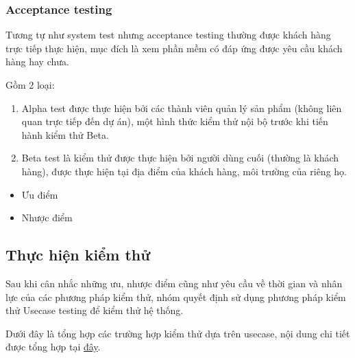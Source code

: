 \subsubsection{Acceptance testing}
Tương tự như system test nhưng acceptance testing thường được khách hàng trực tiếp thực hiện, mục đích là xem phần mềm có đáp ứng được yêu cầu khách hàng hay chưa.

Gồm 2 loại:
\begin{enumerate}
    \item Alpha test được thực hiện bởi các thành viên quản lý sản phẩm (không liên quan trực tiếp đến dự án), một hình thức kiểm thử nội bộ trước khi tiến hành kiểm thử Beta.
    \item Beta test là kiểm thử được thực hiện bởi người dùng cuối (thường là khách hàng), được thực hiện tại địa điểm của khách hàng, môi trường của riêng họ.
\end{enumerate}

\begin{itemize}
    \item Ưu điểm
    \item Nhược điểm
\end{itemize}

\subsection{Thực hiện kiểm thử}

Sau khi cân nhắc những ưu, nhược điểm cũng như yêu cầu về thời gian và nhân lực của các phương pháp kiểm thử, nhóm quyết định sử dụng phương pháp kiểm thử Usecase testing để kiểm thử hệ thống.

Dưới đây là tổng hợp các trường hợp kiểm thử dựa trên usecase, nội dung chi tiết được tổng hợp tại \href{https://docs.google.com/spreadsheets/d/1yDyn8-fa67zlSFjvmJKY9pEwQEnEU2gvkhm_gCw2BHo/edit#gid=0}{đây}.

